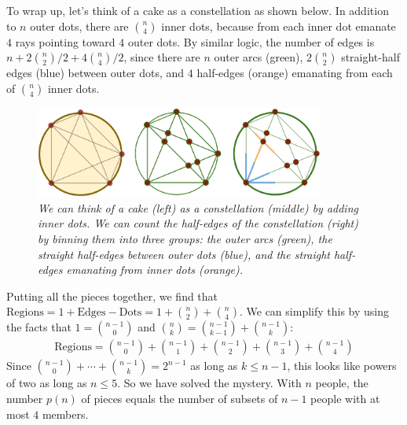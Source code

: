 \documentclass{article}
\begin{document}
            To wrap up, let's think of a cake as a constellation as shown
            below.  In addition to $n$ outer dots, there are ${n \choose 4}$
            inner dots, because from each inner dot emanate $4$ rays pointing
            toward $4$ outer dots.  By similar logic, the number of edges is $n
            + 2{n\choose 2}/2 + 4{n \choose 4}/2$, since there are $n$ outer
            arcs (green), $2{n\choose 2}$ straight-half edges (blue) between
            outer dots, and $4$ half-edges (orange) emanating from each of
            ${n\choose 4}$ inner dots.
            \begin{figure}[h!]
                \centering
                \includegraphics[height=3cm]{count}
                \caption{\emph{
                    We can think of a cake (left)
                    as a constellation (middle) by adding inner dots.
                    We can count the half-edges of the constellation (right) 
                    by binning them into three groups: the outer arcs (green),
                    the straight half-edges between outer dots (blue), and the
                    straight half-edges emanating from inner dots (orange).
                }}
            \end{figure}

            Putting all the pieces together, we find that
            $
                \text{Regions} = 1 + \text{Edges} - \text{Dots}
                               = 1 + {n\choose 2} + {n\choose 4}
            $.  We can simplify this by using the facts that $1={n-1 \choose
            0}$ and ${n \choose k} = {n-1 \choose k-1} + {n-1 \choose k}$:
            \begin{align*}
                \text{Regions}
                              = {n-1 \choose 0}
                              + {n-1 \choose 1}
                              + {n-1 \choose 2}
                              + {n-1 \choose 3}
                              + {n-1 \choose 4}
            \end{align*}
            Since ${n-1\choose 0} + \cdots + {n-1\choose k} = 2^{n-1}$ as long
            as $k\leq n-1$, this looks like powers of two as long as $n\leq 5$.  
            So we have solved the mystery.  With $n$ people, the number $p(n)$
            of pieces equals the number of subsets of $n-1$ people with at most
            $4$ members.    
 
\end{document}
